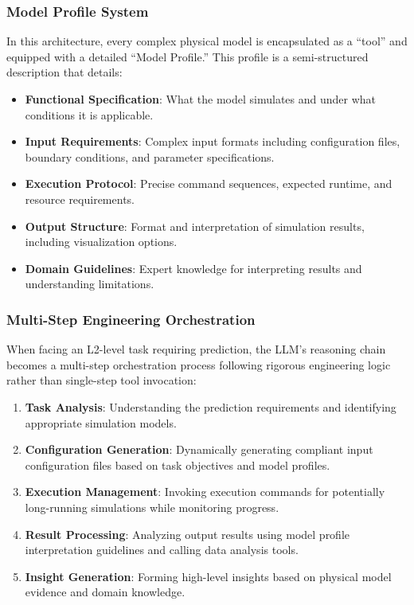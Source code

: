 \subsubsection{Model Profile System}

In this architecture, every complex physical model is encapsulated as a ``tool'' and equipped with a detailed ``Model Profile.'' This profile is a semi-structured description that details:

\begin{itemize}
\item \textbf{Functional Specification}: What the model simulates and under what conditions it is applicable.
\item \textbf{Input Requirements}: Complex input formats including configuration files, boundary conditions, and parameter specifications.
\item \textbf{Execution Protocol}: Precise command sequences, expected runtime, and resource requirements.
\item \textbf{Output Structure}: Format and interpretation of simulation results, including visualization options.
\item \textbf{Domain Guidelines}: Expert knowledge for interpreting results and understanding limitations.
\end{itemize}

\subsubsection{Multi-Step Engineering Orchestration}

When facing an L2-level task requiring prediction, the LLM's reasoning chain becomes a multi-step orchestration process following rigorous engineering logic rather than single-step tool invocation:

\begin{enumerate}
\item \textbf{Task Analysis}: Understanding the prediction requirements and identifying appropriate simulation models.
\item \textbf{Configuration Generation}: Dynamically generating compliant input configuration files based on task objectives and model profiles.
\item \textbf{Execution Management}: Invoking execution commands for potentially long-running simulations while monitoring progress.
\item \textbf{Result Processing}: Analyzing output results using model profile interpretation guidelines and calling data analysis tools.
\item \textbf{Insight Generation}: Forming high-level insights based on physical model evidence and domain knowledge.
\end{enumerate}

